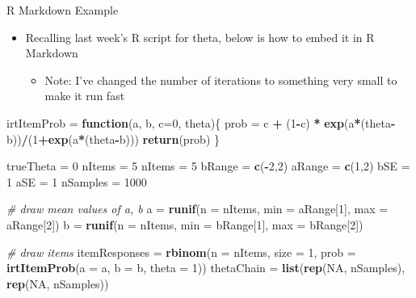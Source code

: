\documentclass[ignorenonframetext,]{beamer}
\newenvironment{Shaded}{\begin{snugshade}}{\end{snugshade}}
\newcommand{\KeywordTok}[1]{\textcolor[rgb]{0.13,0.29,0.53}{\textbf{#1}}}
\newcommand{\DataTypeTok}[1]{\textcolor[rgb]{0.13,0.29,0.53}{#1}}
\newcommand{\DecValTok}[1]{\textcolor[rgb]{0.00,0.00,0.81}{#1}}
\newcommand{\StringTok}[1]{\textcolor[rgb]{0.31,0.60,0.02}{#1}}
\newcommand{\CommentTok}[1]{\textcolor[rgb]{0.56,0.35,0.01}{\textit{#1}}}
\newcommand{\OtherTok}[1]{\textcolor[rgb]{0.56,0.35,0.01}{#1}}
\newcommand{\ControlFlowTok}[1]{\textcolor[rgb]{0.13,0.29,0.53}{\textbf{#1}}}
\newcommand{\OperatorTok}[1]{\textcolor[rgb]{0.81,0.36,0.00}{\textbf{#1}}}
\newcommand{\NormalTok}[1]{#1}
\providecommand{\tightlist}{%
  \setlength{\itemsep}{0pt}\setlength{\parskip}{0pt}}
\begin{document}
\begin{frame}[fragile]{R Markdown Example}

\begin{itemize}
\tightlist
\item
  Recalling last week's R script for theta, below is how to embed it in
  R Markdown

  \begin{itemize}
  \tightlist
  \item
    Note: I've changed the number of iterations to something very small
    to make it run fast
  \end{itemize}
\end{itemize}

\begin{Shaded}
\begin{Highlighting}[]
\NormalTok{irtItemProb =}\StringTok{ }\ControlFlowTok{function}\NormalTok{(a, b, }\DataTypeTok{c=}\DecValTok{0}\NormalTok{, theta)\{}
\NormalTok{  prob =}\StringTok{ }\NormalTok{c }\OperatorTok{+}\StringTok{ }\NormalTok{(}\DecValTok{1}\OperatorTok{-}\NormalTok{c) }\OperatorTok{*}\StringTok{ }\KeywordTok{exp}\NormalTok{(a}\OperatorTok{*}\NormalTok{(theta}\OperatorTok{-}\NormalTok{b))}\OperatorTok{/}\NormalTok{(}\DecValTok{1}\OperatorTok{+}\KeywordTok{exp}\NormalTok{(a}\OperatorTok{*}\NormalTok{(theta}\OperatorTok{-}\NormalTok{b)))}
  \KeywordTok{return}\NormalTok{(prob)}
\NormalTok{\}}

\NormalTok{trueTheta =}\StringTok{ }\DecValTok{0}
\NormalTok{nItems =}\StringTok{ }\DecValTok{5}
\NormalTok{nItems =}\StringTok{ }\DecValTok{5}
\NormalTok{bRange =}\StringTok{ }\KeywordTok{c}\NormalTok{(}\OperatorTok{-}\DecValTok{2}\NormalTok{,}\DecValTok{2}\NormalTok{)}
\NormalTok{aRange =}\StringTok{ }\KeywordTok{c}\NormalTok{(}\DecValTok{1}\NormalTok{,}\DecValTok{2}\NormalTok{)}
\NormalTok{bSE =}\StringTok{ }\DecValTok{1}
\NormalTok{aSE =}\StringTok{ }\DecValTok{1}
\NormalTok{nSamples =}\StringTok{ }\DecValTok{1000}

\CommentTok{# draw mean values of a, b}
\NormalTok{a =}\StringTok{ }\KeywordTok{runif}\NormalTok{(}\DataTypeTok{n =}\NormalTok{ nItems, }\DataTypeTok{min =}\NormalTok{ aRange[}\DecValTok{1}\NormalTok{], }\DataTypeTok{max =}\NormalTok{ aRange[}\DecValTok{2}\NormalTok{])}
\NormalTok{b =}\StringTok{ }\KeywordTok{runif}\NormalTok{(}\DataTypeTok{n =}\NormalTok{ nItems, }\DataTypeTok{min =}\NormalTok{ bRange[}\DecValTok{1}\NormalTok{], }\DataTypeTok{max =}\NormalTok{ bRange[}\DecValTok{2}\NormalTok{])}

\CommentTok{# draw items}
\NormalTok{itemResponses =}\StringTok{ }\KeywordTok{rbinom}\NormalTok{(}\DataTypeTok{n =}\NormalTok{ nItems, }\DataTypeTok{size =} \DecValTok{1}\NormalTok{, }\DataTypeTok{prob =} \KeywordTok{irtItemProb}\NormalTok{(}\DataTypeTok{a =}\NormalTok{ a, }\DataTypeTok{b =}\NormalTok{ b, }\DataTypeTok{theta =} \DecValTok{1}\NormalTok{))}
\NormalTok{thetaChain =}\StringTok{ }\KeywordTok{list}\NormalTok{(}\KeywordTok{rep}\NormalTok{(}\OtherTok{NA}\NormalTok{, nSamples), }\KeywordTok{rep}\NormalTok{(}\OtherTok{NA}\NormalTok{, nSamples))}


\end{Highlighting}
\end{Shaded}
\end{frame}
\end{document}
